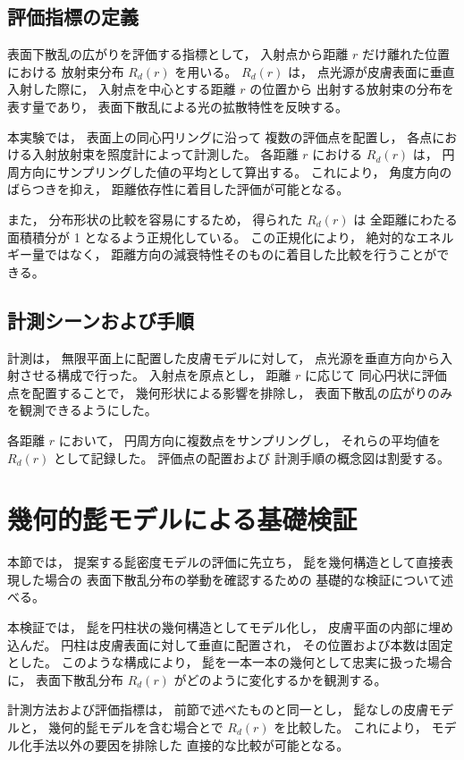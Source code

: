 \subsection{評価指標の定義}
\label{sec:rd_definition}
表面下散乱の広がりを評価する指標として，
入射点から距離 $r$ だけ離れた位置における
放射束分布 $R_d(r)$ を用いる。
$R_d(r)$ は，
点光源が皮膚表面に垂直入射した際に，
入射点を中心とする距離 $r$ の位置から
出射する放射束の分布を表す量であり，
表面下散乱による光の拡散特性を反映する。

本実験では，
表面上の同心円リングに沿って
複数の評価点を配置し，
各点における入射放射束を照度計によって計測した。
各距離 $r$ における $R_d(r)$ は，
円周方向にサンプリングした値の平均として算出する。
これにより，
角度方向のばらつきを抑え，
距離依存性に着目した評価が可能となる。

また，
分布形状の比較を容易にするため，
得られた $R_d(r)$ は
全距離にわたる面積積分が 1 となるよう正規化している。
この正規化により，
絶対的なエネルギー量ではなく，
距離方向の減衰特性そのものに着目した比較を行うことができる。

\subsection{計測シーンおよび手順}
\label{sec:rd_procedure}
計測は，
無限平面上に配置した皮膚モデルに対して，
点光源を垂直方向から入射させる構成で行った。
入射点を原点とし，
距離 $r$ に応じて
同心円状に評価点を配置することで，
幾何形状による影響を排除し，
表面下散乱の広がりのみを観測できるようにした。

各距離 $r$ において，
円周方向に複数点をサンプリングし，
それらの平均値を $R_d(r)$ として記録した。
評価点の配置および
計測手順の概念図は割愛する。


\section{幾何的髭モデルによる基礎検証}
\label{sec:geom_beard}
本節では，
提案する髭密度モデルの評価に先立ち，
髭を幾何構造として直接表現した場合の
表面下散乱分布の挙動を確認するための
基礎的な検証について述べる。

本検証では，
髭を円柱状の幾何構造としてモデル化し，
皮膚平面の内部に埋め込んだ。
円柱は皮膚表面に対して垂直に配置され，
その位置および本数は固定とした。
このような構成により，
髭を一本一本の幾何として忠実に扱った場合に，
表面下散乱分布 $R_d(r)$ がどのように変化するかを観測する。

計測方法および評価指標は，
前節で述べたものと同一とし，
髭なしの皮膚モデルと，
幾何的髭モデルを含む場合とで
$R_d(r)$ を比較した。
これにより，
モデル化手法以外の要因を排除した
直接的な比較が可能となる。

